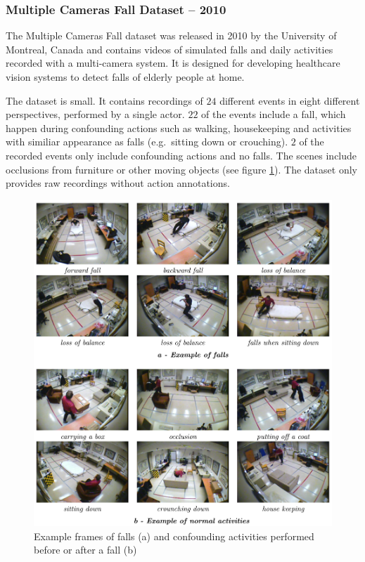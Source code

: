 

\subsubsection{Multiple Cameras Fall Dataset -- 2010}
The Multiple Cameras Fall dataset \cite{auvinet_multiple_2010} was released in 2010 by the University of Montreal, Canada and contains videos of simulated falls and daily activities recorded with a multi-camera system.
It is designed for developing healthcare vision systems to detect falls of elderly people at home.

The dataset is small. It contains recordings of $24$ different events in eight different perspectives, performed by a single actor.
$22$ of the events include a fall, which happen during confounding actions such as walking, housekeeping and activities with similiar appearance as falls (e.g.\ sitting down or crouching).
$2$ of the recorded events only include confounding actions and no falls.
The scenes include occlusions from furniture or other moving objects (see figure \ref{fig:multiplecamerasfall_example}).
The dataset only provides raw recordings without action annotations.

\begin{figure}[H]
    \centering
    \includegraphics[width=\textwidth]{img_datasets/multiplecamerasfall_example}
    \caption{Example frames of falls (a) and confounding activities performed before or after a fall (b) \cite{auvinet_multiple_2010}}
    \label{fig:multiplecamerasfall_example}
\end{figure}


